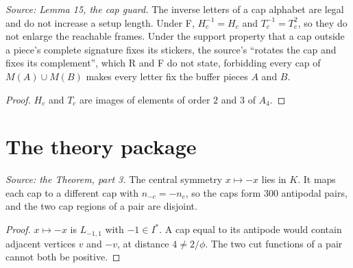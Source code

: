 \begin{lemma}
  \label{lem:cap-guard}
  \leanok
  \textit{Source: Lemma 15, the cap guard.}
  The inverse letters of a cap alphabet are legal and do not increase a
  setup length. Under F, \(H_c^{-1}=H_c\) and \(T_c^{-1}=T_c^2\), so they do
  not enlarge the reachable frames. Under the support property that a cap
  outside a piece's complete signature fixes its stickers, the source's
  ``rotates the cap and fixes its complement'', which R and F do not
  state, forbidding every cap of \(M(A)\cup M(B)\) makes every letter fix
  the buffer pieces \(A\) and \(B\).
\end{lemma}
\begin{proof}
  \leanok
  \(H_c\) and \(T_c\) are images of elements of order \(2\) and \(3\) of
  \(A_4\).
\end{proof}

\section{The theory package}

\begin{lemma}
  \label{lem:antipodal-axes}
  \leanok
  \textit{Source: the Theorem, part 3.}
  The central symmetry \(x\mapsto-x\) lies in \(K\). It maps each cap to a
  different cap with \(n_{-c}=-n_c\), so the caps form \(300\) antipodal
  pairs, and the two cap regions of a pair are disjoint.
\end{lemma}
\begin{proof}
  \leanok
  \(x\mapsto-x\) is \(L_{-1,1}\) with \(-1\in I^*\). A cap equal to its
  antipode would contain adjacent vertices \(v\) and \(-v\), at distance
  \(4\ne2/\phi\). The two cut functions of a pair cannot both be positive.
\end{proof}

